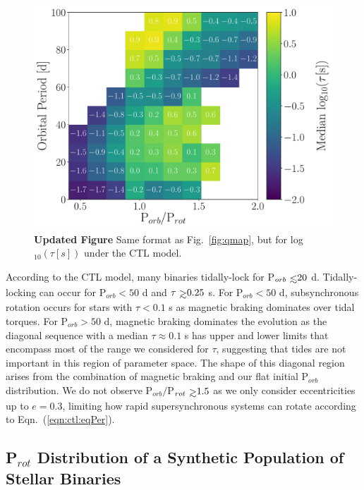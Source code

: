 \documentclass[twocolumn]{aastex61}
\def\gsim{~\rlap{$>$}{\lower 1.0ex\hbox{$\sim$}}}
\def\lsim{~\rlap{$<$}{\lower 1.0ex\hbox{$\sim$}}}
\newcommand{\xxx}[1]{{\textbf{#1}}}
\begin{document}
\begin{figure}
	\includegraphics[width=\textwidth]{../Plots/porbProtPorbTauHist.pdf}
   \caption{\xxx{Updated Figure} Same format as Fig.~\ref{fig:qmap}, but for log$_{10}(\tau [s])$ under the CTL model. }%
    \label{fig:taumap}%
\end{figure}

According to the CTL model, many binaries tidally-lock for P$_{orb} \lsim 20$ d. Tidally-locking can occur for P$_{orb} < 50$ d and $\tau \gsim 0.25$ s.  For P$_{orb} < 50$ d, subsynchronous rotation occurs for stars with $\tau < 0.1$ s as magnetic braking dominates over tidal torques.  For P$_{orb} > 50$ d, magnetic braking dominates the evolution as the diagonal sequence with a median $\tau \approx 0.1$ s has upper and lower limits that encompass most of the range we considered for $\tau$, suggesting that tides are not important in this region of parameter space.  The shape of this diagonal region arises from the combination of magnetic braking and our flat initial P$_{orb}$ distribution. We do not observe P$_{orb}/$P$_{rot} \gsim 1.5$ as we only consider eccentricities up to $e = 0.3$, limiting how rapid supersynchronous systems can rotate according to Eqn.~(\ref{eqn:ctl:eqPer}).

\subsection{P$_{rot}$ Distribution of a Synthetic Population of Stellar Binaries} \label{sec:protDist}
\end{document}
